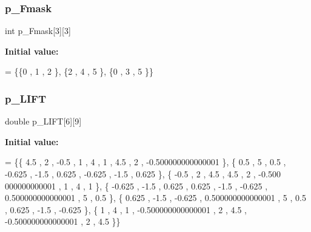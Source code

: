 \subsubsection{\texorpdfstring{p\+\_\+\+Fmask}{p\_Fmask}}
{\footnotesize\ttfamily int p\+\_\+\+Fmask\mbox{[}3\mbox{]}\mbox{[}3\mbox{]}}

{\bfseries Initial value\+:}
\begin{DoxyCode}
= \{\{0 , 1 , 2 \},
\{2 , 4 , 5 \},
\{0 , 3 , 5 \}\}
\end{DoxyCode}
\mbox{\label{a00509_ab0d769e56dcd346024ae834d5a7fb7ce}} 
\subsubsection{\texorpdfstring{p\+\_\+\+L\+I\+FT}{p\_LIFT}}
{\footnotesize\ttfamily double p\+\_\+\+L\+I\+FT\mbox{[}6\mbox{]}\mbox{[}9\mbox{]}}

{\bfseries Initial value\+:}
\begin{DoxyCode}
= \{\{              4.5 ,                 2 ,              -0.5 ,                 1 ,                 4 ,    
                   1 ,               4.5 ,                 2 , -0.500000000000001 \},
\{              0.5 ,                 5 ,               0.5 ,            -0.625 ,              -1.5 ,       
            0.625 ,            -0.625 ,              -1.5 ,             0.625 \},
\{             -0.5 ,                 2 ,               4.5 ,               4.5 ,                 2 , -0.500
      000000000001 ,                 1 ,                 4 ,                 1 \},
\{           -0.625 ,              -1.5 ,             0.625 ,             0.625 ,              -1.5 ,       
           -0.625 , 0.500000000000001 ,                 5 ,               0.5 \},
\{            0.625 ,              -1.5 ,            -0.625 , 0.500000000000001 ,                 5 ,       
              0.5 ,             0.625 ,              -1.5 ,            -0.625 \},
\{                1 ,                 4 ,                 1 , -0.500000000000001 ,                 2 ,      
               4.5 , -0.500000000000001 ,                 2 ,               4.5 \}\}
\end{DoxyCode}
\mbox{\label{a00509_a0df60dbb73098f125698cce08e503a6e}} 
